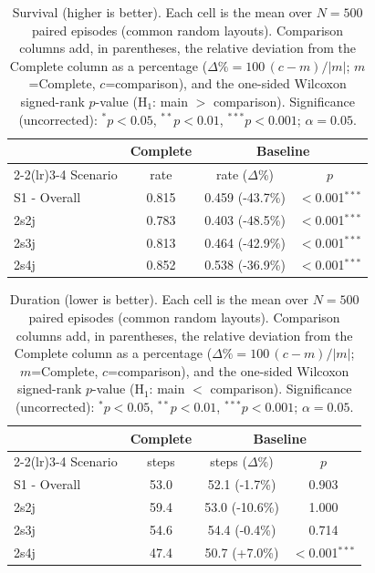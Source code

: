 \begin{table}[ht]
  \centering
  \caption{Survival (higher is better). Each cell is the mean over $N=500$ paired episodes (common random layouts). Comparison columns add, in parentheses, the relative deviation from the Complete column as a percentage ($\Delta\%=100\,(c-m)/|m|$; $m$=Complete, $c$=comparison), and the one-sided Wilcoxon signed-rank $p$-value (H$_1$: main $>$ comparison). Significance (uncorrected): $^{*}p<0.05$, $^{**}p<0.01$, $^{***}p<0.001$; $\alpha=0.05$.}
  \label{tab:wilcoxon-survival}
  \small
  \begin{tabular}{l c cc}
    \toprule
     & Complete & \multicolumn{2}{c}{Baseline} \\
    \cmidrule(lr){2-2}\cmidrule(lr){3-4}
    Scenario & {rate} & {rate ($\Delta$\%)} & {$p$} \\
    \midrule
    S1 - Overall & 0.815 & 0.459 (-43.7\%) & $<$0.001$^{***}$ \\
    2s2j & 0.783 & 0.403 (-48.5\%) & $<$0.001$^{***}$ \\
    2s3j & 0.813 & 0.464 (-42.9\%) & $<$0.001$^{***}$ \\
    2s4j & 0.852 & 0.538 (-36.9\%) & $<$0.001$^{***}$ \\
    \bottomrule
  \end{tabular}
\end{table}

\begin{table}[ht]
  \centering
  \caption{Duration (lower is better). Each cell is the mean over $N=500$ paired episodes (common random layouts). Comparison columns add, in parentheses, the relative deviation from the Complete column as a percentage ($\Delta\%=100\,(c-m)/|m|$; $m$=Complete, $c$=comparison), and the one-sided Wilcoxon signed-rank $p$-value (H$_1$: main $<$ comparison). Significance (uncorrected): $^{*}p<0.05$, $^{**}p<0.01$, $^{***}p<0.001$; $\alpha=0.05$.}
  \label{tab:wilcoxon-duration}
  \small
  \begin{tabular}{l c cc}
    \toprule
     & Complete & \multicolumn{2}{c}{Baseline} \\
    \cmidrule(lr){2-2}\cmidrule(lr){3-4}
    Scenario & {steps} & {steps ($\Delta$\%)} & {$p$} \\
    \midrule
    S1 - Overall & 53.0 & 52.1 (-1.7\%) & 0.903 \\
    2s2j & 59.4 & 53.0 (-10.6\%) & 1.000 \\
    2s3j & 54.6 & 54.4 (-0.4\%) & 0.714 \\
    2s4j & 47.4 & 50.7 (+7.0\%) & $<$0.001$^{***}$ \\
    \bottomrule
  \end{tabular}
\end{table}

